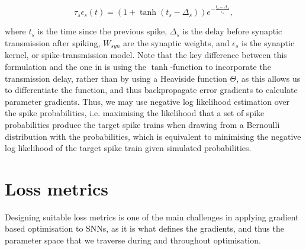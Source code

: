 \documentclass[mphil,deptreport,ianc]{infthesis} %
\begin{document}
\begin{equation}
    \tau_s \epsilon_s(t) = (1 + \tanh(t_{s} - \Delta_s)) e^{-\frac{t_{s} - \Delta_s}{\tau_s}},
\end{equation}

where $t_s$ is the time since the previous spike, $\Delta_s$ is the delay before synaptic transmission after spiking, $W_{syn}$ are the synaptic weights, and $\epsilon_s$ is the synaptic kernel, or spike-transmission model.
Note that the key difference between this formulation and the one in \cite{Rene2020} is using the $\tanh$-function to incorporate the transmission delay, rather than by using a Heaviside function $\Theta$, as this allows us to differentiate the function, and thus backpropagate error gradients to calculate parameter gradients.
Thus, we may use negative log likelihood estimation over the spike probabilities, i.e. maximising the likelihood that a set of spike probabilities produce the target spike trains when drawing from a Bernoulli distribution with the probabilities, which is equivalent to minimising the negative log likelihood of the target spike train given simulated probabilities.







\section{Loss metrics}


Designing suitable loss metrics is one of the main challenges in applying gradient based optimisation to SNNs, as it is what defines the gradients, and thus the parameter space that we traverse during and throughout optimisation.
\end{document}
